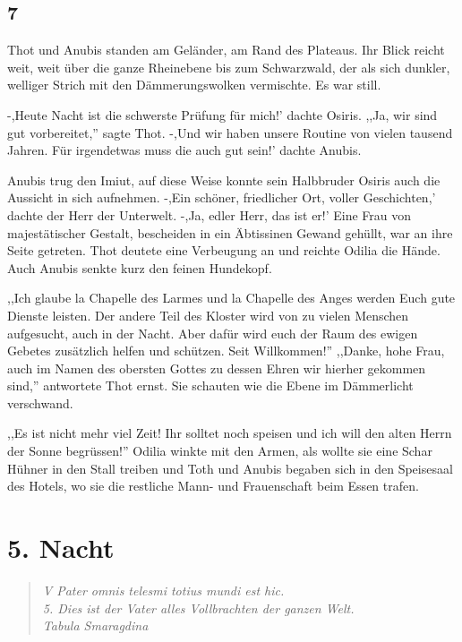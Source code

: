 \documentclass[11pt,titlepage,a5paper]{book}
\begin{document}
\section*{7}

Thot und Anubis standen am Geländer, am Rand des Plateaus. Ihr Blick reicht weit, weit über die ganze Rheinebene bis zum Schwarzwald, der als sich dunkler, welliger Strich mit den Dämmerungswolken vermischte. Es war still. 

-,Heute Nacht ist die schwerste Prüfung für mich!' dachte Osiris. ,,Ja, wir sind gut vorbereitet,'' sagte Thot. -,Und wir haben unsere Routine von vielen tausend Jahren. Für irgendetwas muss die auch gut sein!' dachte Anubis.

Anubis trug den Imiut, auf diese Weise konnte sein Halbbruder Osiris auch die Aussicht in sich aufnehmen. -,Ein schöner, friedlicher Ort, voller Geschichten,' dachte der Herr der Unterwelt. -,Ja, edler Herr, das ist er!' Eine Frau von majestätischer Gestalt, bescheiden in ein Äbtissinen Gewand gehüllt, war an ihre Seite getreten. Thot deutete eine Verbeugung an und reichte Odilia die Hände. Auch Anubis senkte kurz den feinen Hundekopf. 

,,Ich glaube la Chapelle des Larmes und la Chapelle des Anges werden Euch gute Dienste leisten. Der andere Teil des Kloster wird von zu vielen Menschen aufgesucht, auch in der Nacht. Aber dafür wird euch der Raum des ewigen Gebetes zusätzlich helfen und schützen. Seit Willkommen!'' ,,Danke, hohe Frau, auch im Namen des obersten Gottes zu dessen Ehren wir hierher gekommen sind,'' antwortete Thot ernst. Sie schauten wie die Ebene im Dämmerlicht verschwand.

,,Es ist nicht mehr viel Zeit! Ihr solltet noch speisen und ich will den alten Herrn der Sonne begrüssen!'' Odilia winkte mit den Armen, als wollte sie eine Schar Hühner in den Stall treiben und Toth und Anubis begaben sich in den Speisesaal des Hotels, wo sie die restliche Mann- und Frauenschaft beim Essen trafen.


\chapter*{5. Nacht}

\begin{quotation}

\emph{V Pater omnis telesmi totius mundi est hic.\\5. Dies ist der Vater alles Vollbrachten der ganzen Welt.  \\Tabula Smaragdina}

\end{quotation}
\end{document}
